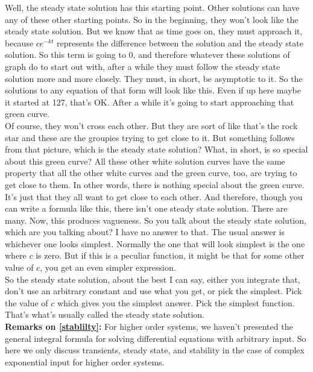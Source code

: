 Well, the steady state solution has this starting point.
Other solutions can have any of these other starting points.
So in the beginning, they won't look like the steady state solution.
But we know that as time goes on, they must approach it,
because $c e^{-kt}$ represents the difference between the solution and the steady state solution.
So this term is going to $0$, and therefore whatever these solutions of graph do to start out with,
after a while they must follow the steady state solution more and more closely.
They must, in short, be asymptotic to it.
So the solutions to any equation of that form will look like this.
Even if up here maybe it started at 127, that's OK.
After a while it's going to start approaching that green curve.\\

Of course, they won't cross each other.
But they are sort of like that's the rock star and these are the groupies trying to get close to it.
But something follows from that picture, which is the steady state solution?
What, in short, is so special about this green curve?
All these other white solution curves have the same property that all the other white curves
and the green curve, too, are trying to get close to them.
In other words, there is nothing special about the green curve.
It's just that they all want to get close to each other.
And therefore, though you can write a formula like this, there isn't one steady state solution.
There are many. Now, this produces vagueness.
So you talk about the steady state solution, which are you talking about?
I have no answer to that. The usual answer is whichever one looks simplest.
Normally the one that will look simplest is the one where $c$ is zero.
But if this is a peculiar function, it might be that for some other value of $c$,
you get an even simpler expression.\\

So the steady state solution, about the best I can say, either you integrate that, don't use an arbitrary constant and use what you get, or pick the simplest.
Pick the value of $c$ which gives you the simplest answer.
Pick the simplest function.
That's what's usually called the steady state solution.\\

\textbf{\color{orange} Remarks on \ref{stablilty}: }
For higher order systems, we haven't presented the general integral formula
for solving differential equations with arbitrary input.
So here we only discuss transients, steady state, and stability
in the case of complex exponential input for higher order systems.\\

